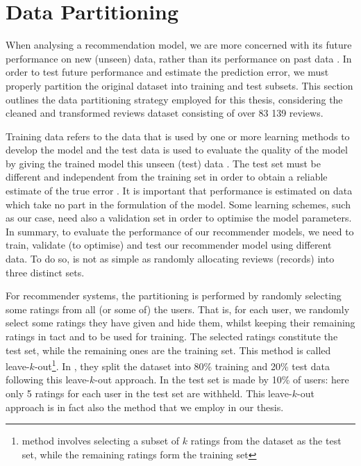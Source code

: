 \section{Data Partitioning}
\label{sec:3 Data Partitioning}

When analysing a recommendation model, we are more concerned with its future performance on new (unseen) data, rather than its performance on past data \cite{witten2005practical}. In order to test future performance and estimate the prediction error, we must properly partition the original dataset into training and test subsets. This section outlines the data partitioning strategy employed for this thesis, considering the cleaned and transformed reviews dataset consisting of over 83 139 reviews.

Training data refers to the data that is used by one or more learning methods to develop the model and the test data is used to evaluate the quality of the model by giving the trained model this unseen (test) data \cite{witten2005practical}. The test set must be different and independent from the training set in order to obtain a reliable estimate of the true error \cite{witten2005practical}. It is important that performance is estimated on data which take no part in the formulation of the model. Some learning schemes, such as our case, need also a validation set in order to optimise the model parameters. In summary, to evaluate the performance of our recommender models, we need to train, validate (to optimise) and test our recommender model using different data. To do so, is not as simple as randomly allocating reviews (records) into three distinct sets. 

For recommender systems, the partitioning is performed by randomly selecting some ratings from all (or some of) the users. That is, for each user, we randomly select some ratings they have given and hide them, whilst keeping their remaining ratings in tact and to be used for training. The selected ratings constitute the test set, while the remaining ones are the training set. This method is called leave-$k$-out\footnote{method involves selecting a subset of $k$ ratings from the dataset as the test set, while the remaining ratings form the training set}. In \cite{sarwar2002incremental}, they split the dataset into 80\% training and 20\% test data following this leave-$k$-out approach. In \cite{herlocker1999algorithmic} the test set is made by 10\% of users: here only 5 ratings for each user in the test set are withheld. This leave-$k$-out approach is in fact also the method that we employ in our thesis. 

